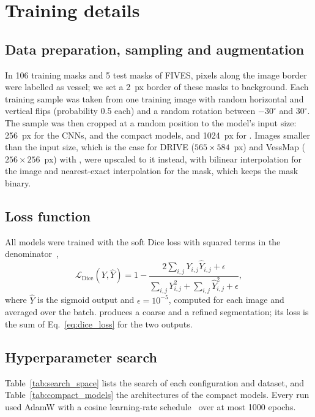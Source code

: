 \clearpage
\appendix

\section{Training details}
\label{app:training}

\subsection{Data preparation, sampling and augmentation}
In 106 training masks and 5 test masks of FIVES, pixels along the image border were labelled as vessel; we set a 2~px border of these masks to background. Each training sample was taken from one training image with random horizontal and vertical flips (probability 0.5 each) and a random rotation between $-30^\circ$ and $30^\circ$. The sample was then cropped at a random position to the model's input size: 256~px for the CNNs, \litemedsam{} and the compact models, and 1024~px for \medsam{}. Images smaller than the input size, which is the case for DRIVE ($565 \times 584$~px) and VessMap ($256 \times 256$~px) with \medsam{}, were upscaled to it instead, with bilinear interpolation for the image and nearest-exact interpolation for the mask, which keeps the mask binary.

\subsection{Loss function}
All models were trained with the soft Dice loss with squared terms in the denominator~\cite{milletari2016vnet},
\begin{equation}
    \mathcal{L}_{\text{Dice}}(Y, \hat{Y}) = 1 - \frac{2 \sum_{i,j} Y_{i,j} \hat{Y}_{i,j} + \epsilon}{\sum_{i,j} Y_{i,j}^2 + \sum_{i,j} \hat{Y}_{i,j}^2 + \epsilon},
    \label{eq:dice_loss}
\end{equation}
where $\hat{Y}$ is the sigmoid output and $\epsilon = 10^{-5}$, computed for each image and averaged over the batch. \lwnet{} produces a coarse and a refined segmentation; its loss is the sum of Eq.~\eqref{eq:dice_loss} for the two outputs.

\subsection{Hyperparameter search}
Table~\ref{tab:search_space} lists the search of each configuration and dataset, and Table~\ref{tab:compact_models} the architectures of the compact models. Every run used AdamW with a cosine learning-rate schedule~\cite{loshchilov2017sgdr} over at most 1000 epochs.

